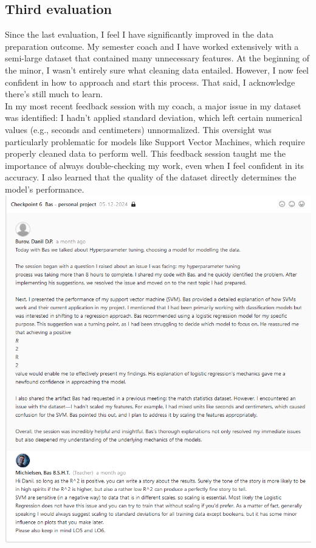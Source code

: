 \documentclass{article}
\begin{document}
	\subsection{Third evaluation}
	Since the last evaluation, I feel I have significantly improved in the data preparation outcome. My semester coach and I have worked extensively with a semi-large dataset that contained many unnecessary features. At the beginning of the minor, I wasn’t entirely sure what cleaning data entailed. However, I now feel confident in how to approach and start this process. That said, I acknowledge there’s still much to learn.\\
	
	In my most recent feedback session with my coach, a major issue in my dataset was identified: I hadn’t applied standard deviation, which left certain numerical values (e.g., seconds and centimeters) unnormalized. This oversight was particularly problematic for models like Support Vector Machines, which require properly cleaned data to perform well. This feedback session taught me the importance of always double-checking my work, even when I feel confident in its accuracy. I also learned that the quality of the dataset directly determines the model’s performance.\\
	
	 \includegraphics[width=\textwidth]{images/Feedback_Bas_2.png}\\
	
\end{document}
